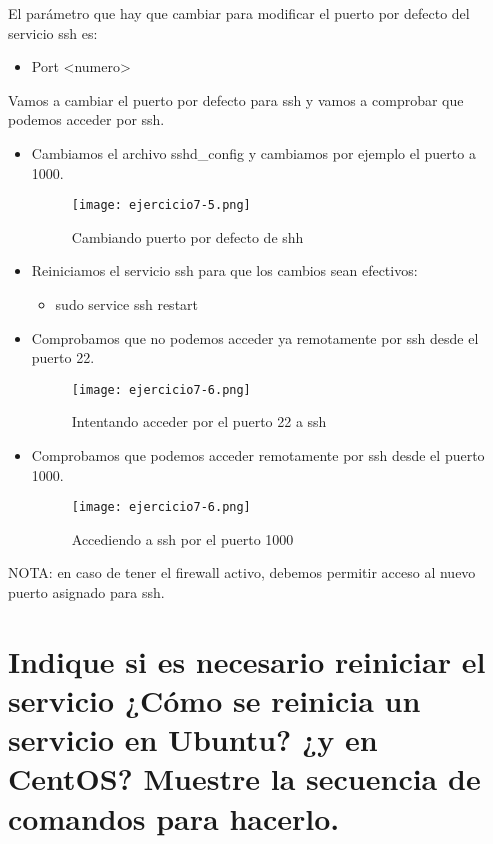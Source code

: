 	
	El parámetro que hay que cambiar para modificar el puerto\cite{ejercicio7-3} por defecto del servicio ssh es:
	\begin{itemize}
		\item Port <numero>
	\end{itemize}
	
	Vamos a cambiar el puerto por defecto para ssh y vamos a comprobar que podemos acceder por ssh.
	\begin{itemize}
		\item Cambiamos el archivo sshd\_config y cambiamos por ejemplo el puerto a 1000.
			\begin{figure}[H]	
				\centering
				\texttt{[image: ejercicio7-5.png]} 
				\label{figura60} 
				\caption{Cambiando puerto por defecto de shh}
			\end{figure}
		\item Reiniciamos el servicio ssh para que los cambios sean efectivos:
		\begin{itemize}
			\item sudo service ssh restart
		\end{itemize}
		\item Comprobamos que no podemos acceder ya remotamente por ssh desde el puerto 22.
			\begin{figure}[H]	
				\centering
				\texttt{[image: ejercicio7-6.png]} 
				\label{figura61} 
				\caption{Intentando acceder por el puerto 22 a ssh}
			\end{figure}
		\item Comprobamos que podemos acceder remotamente por ssh desde el puerto 1000.
			\begin{figure}[H]	
				\centering
				\texttt{[image: ejercicio7-6.png]} 
				\label{figura62} 
				\caption{Accediendo a ssh por el puerto 1000}
			\end{figure}
	\end{itemize}
	
	
	NOTA: en caso de tener el firewall activo, debemos permitir acceso al nuevo puerto asignado para ssh.

	\section{Indique si es necesario reiniciar el servicio ¿Cómo se reinicia un servicio en Ubuntu? ¿y en CentOS? Muestre la secuencia de comandos para hacerlo.}
	
